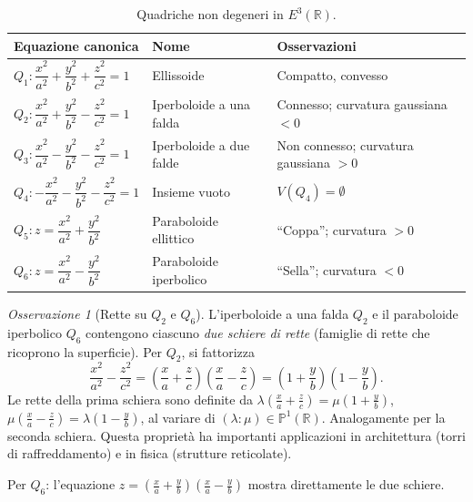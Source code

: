 \documentclass[11pt, a4paper]{book}
\theoremstyle{definition}
\theoremstyle{plain}
\theoremstyle{remark}
\newtheorem{osservazione}[definizione]{Osservazione}
\newcommand{\R}{\mathbb{R}}
\begin{document}
\begin{table}[h!]
\centering
\caption{Quadriche non degeneri in $E^3(\R)$.}
\label{tab:quadriche}
\renewcommand{\arraystretch}{1.8}
\begin{tabular}{lll}
\toprule
\textbf{Equazione canonica} & \textbf{Nome} & \textbf{Osservazioni} \\
\midrule
$Q_1\colon \dfrac{x^2}{a^2}+\dfrac{y^2}{b^2}+\dfrac{z^2}{c^2}=1$ & Ellissoide & Compatto, convesso \\[4pt]
$Q_2\colon \dfrac{x^2}{a^2}+\dfrac{y^2}{b^2}-\dfrac{z^2}{c^2}=1$ & Iperboloide a una falda & Connesso; curvatura gaussiana $<0$ \\[4pt]
$Q_3\colon \dfrac{x^2}{a^2}-\dfrac{y^2}{b^2}-\dfrac{z^2}{c^2}=1$ & Iperboloide a due falde & Non connesso; curvatura gaussiana $>0$ \\[4pt]
$Q_4\colon -\dfrac{x^2}{a^2}-\dfrac{y^2}{b^2}-\dfrac{z^2}{c^2}=1$ & Insieme vuoto & $V(Q_4) = \emptyset$ \\[4pt]
$Q_5\colon z=\dfrac{x^2}{a^2}+\dfrac{y^2}{b^2}$ & Paraboloide ellittico & ``Coppa''; curvatura $>0$ \\[4pt]
$Q_6\colon z=\dfrac{x^2}{a^2}-\dfrac{y^2}{b^2}$ & Paraboloide iperbolico & ``Sella''; curvatura $<0$ \\
\bottomrule
\end{tabular}
\end{table}

\begin{osservazione}[Rette su $Q_2$ e $Q_6$]
L'iperboloide a una falda $Q_2$ e il paraboloide iperbolico $Q_6$ contengono ciascuno \emph{due schiere di rette} (famiglie di rette che ricoprono la superficie). Per $Q_2$, si fattorizza
\[
  \frac{x^2}{a^2} - \frac{z^2}{c^2} = \left(\frac{x}{a}+\frac{z}{c}\right)\left(\frac{x}{a}-\frac{z}{c}\right) = \left(1+\frac{y}{b}\right)\left(1-\frac{y}{b}\right).
\]
Le rette della prima schiera sono definite da $\lambda\left(\frac{x}{a}+\frac{z}{c}\right) = \mu\left(1+\frac{y}{b}\right)$, $\mu\left(\frac{x}{a}-\frac{z}{c}\right) = \lambda\left(1-\frac{y}{b}\right)$, al variare di $(\lambda:\mu) \in \mathbb{P}^1(\R)$. Analogamente per la seconda schiera. Questa proprietà ha importanti applicazioni in architettura (torri di raffreddamento) e in fisica (strutture reticolate).

Per $Q_6$: l'equazione $z = \left(\frac{x}{a}+\frac{y}{b}\right)\left(\frac{x}{a}-\frac{y}{b}\right)$ mostra direttamente le due schiere.
\end{osservazione}
\end{document}

